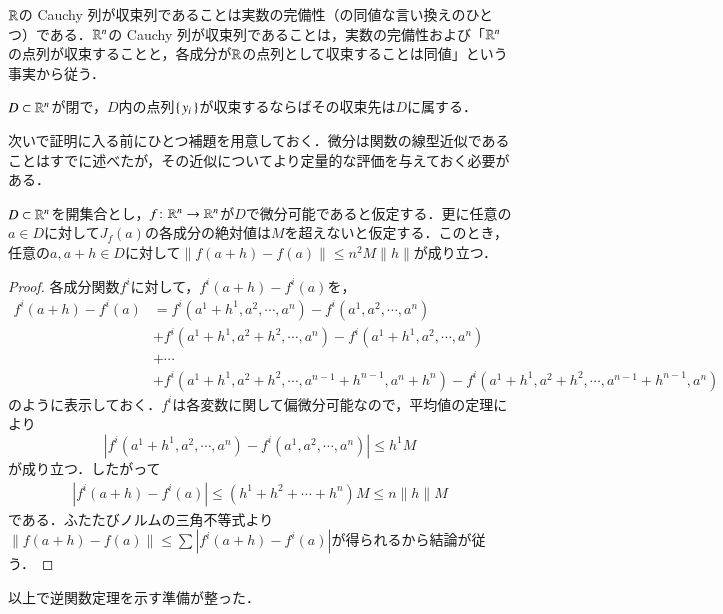 \begin{que}
$\mathbb{R}$の Cauchy 列が収束列であることは実数の完備性（の同値な言い換えのひとつ）である．$\mathbb{R}^n$の Cauchy 列が収束列であることは，実数の完備性および「$\mathbb{R}^n$の点列が収束することと，各成分が$\mathbb{R}$の点列として収束することは同値」という事実から従う．
\end{que}

\begin{que}
$D \subset \mathbb{R}^n$が閉で，$D$内の点列$\set{y_i}$が収束するならばその収束先は$D$に属する．
\end{que}

次いで証明に入る前にひとつ補題を用意しておく．微分は関数の線型近似であることはすでに述べたが，その近似についてより定量的な評価を与えておく必要がある．

\begin{lem}\label{微分の定量評価}
$D \subset \mathbb{R}^n$を開集合とし，$f \colon \mathbb{R}^n \to \mathbb{R}^n$が$D$で微分可能であると仮定する．更に任意の$a \in D$に対して$J_f(a)$の各成分の絶対値は$M$を超えないと仮定する．このとき，任意の$a, a+h \in D$に対して$\|f(a+h) - f(a)\| \leq n^2M\|h\|$が成り立つ．
\end{lem}

\begin{proof}
各成分関数$f^i$に対して，$f^i(a+h) - f^i(a)$を，
\begin{align}
f^i(a+h) - f^i(a) &= f^i(a^1+h^1, a^2, \cdots, a^n) - f^i(a^1 , a^2, \cdots, a^n) \\
&+ f^i(a^1+h^1, a^2+h^2, \cdots, a^n) - f^i(a^1+h^1 , a^2, \cdots, a^n) \\
&+ \cdots \\
&+ f^i(a^1+h^1, a^2+h^2, \cdots, a^{n-1}+h^{n-1} ,a^n+h^n) - f^i(a^1+h^1 , a^2+h^2, \cdots, a^{n-1} +h^{n-1}, a^n)
\end{align}のように表示しておく．$f^i$は各変数に関して偏微分可能なので，平均値の定理により
\begin{equation}
|f^i(a^1+h^1, a^2, \cdots, a^n) - f^i(a^1 , a^2, \cdots, a^n)| \leq h^1 M
\end{equation}が成り立つ．したがって
\begin{align}
|f^i(a+h) - f^i(a)| \leq (h^1 + h^2 + \cdots + h^n)M \leq n\|h\|M
\end{align}である．ふたたびノルムの三角不等式より$\|f(a+h) - f(a)\| \leq \sum |f^i(a + h) - f^i(a)|$が得られるから結論が従う．
\end{proof}

以上で逆関数定理を示す準備が整った．


